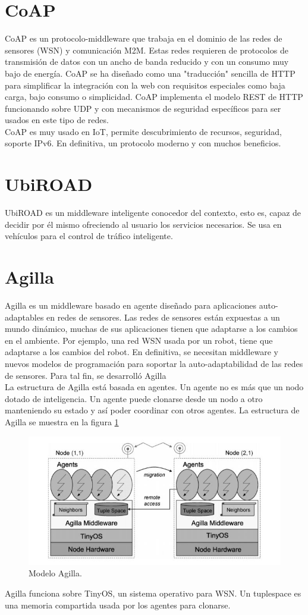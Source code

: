 \documentclass[12pt, twoside]{book}
\begin{document}
\section{CoAP}
CoAP es un protocolo-middleware que trabaja en el dominio de las redes de sensores (WSN) y comunicación M2M. Estas redes requieren de protocolos de transmisión de datos con un ancho de banda reducido y con un consumo muy bajo de energía. CoAP se ha diseñado como una "traducción" sencilla de HTTP para simplificar la integración con la web con requisitos especiales como baja carga, bajo consumo o simplicidad. CoAP implementa el modelo REST de HTTP funcionando sobre UDP y con mecanismos de seguridad específicos para ser usados en este tipo de redes. \\
CoAP es muy usado en IoT, permite descubrimiento de recursos, seguridad, soporte IPv6. En definitiva, un protocolo moderno y con muchos beneficios.
\section{UbiROAD}
UbiROAD es un middleware inteligente conocedor del contexto, esto es, capaz de decidir por él mismo ofreciendo al usuario los servicios necesarios. Se usa en vehículos para el control de tráfico inteligente. 

\section{Agilla}
Agilla\cite{agilla} es un middleware basado en agente diseñado para aplicaciones auto-adaptables en redes de sensores. Las redes de sensores están expuestas a un mundo dinámico, muchas de sus aplicaciones tienen que adaptarse a los cambios en el ambiente. Por ejemplo, una red WSN usada por un robot, tiene que adaptarse a los cambios del robot. En definitiva, se necesitan middleware y nuevos modelos de programación para soportar la auto-adaptabilidad de las redes de sensores. Para tal fin, se desarrolló Agilla\\
La estructura de Agilla está basada en agentes. Un agente no es más que un nodo dotado de inteligencia. Un agente puede clonarse desde un nodo a otro manteniendo su estado y así poder coordinar con otros agentes. La estructura de Agilla se muestra en la figura \ref{agilla}
\begin{figure}[H]
\centering
\includegraphics[scale=0.5]{images/agilla}
\caption{Modelo Agilla.}\label{agilla}
\end{figure}
Agilla funciona sobre TinyOS, un sistema operativo para WSN. Un tuplespace es una memoria compartida usada por los agentes para clonarse.
\end{document}

